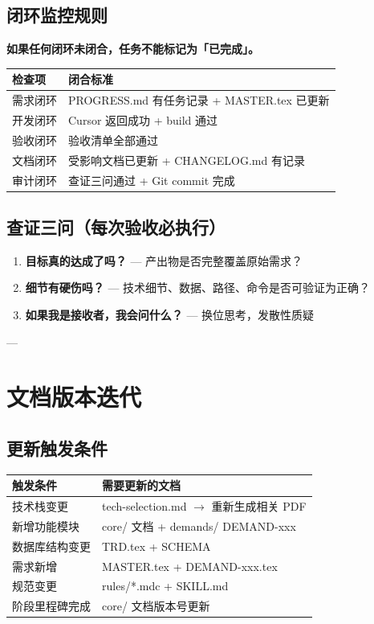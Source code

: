 \documentclass[11pt,a4paper]{article}
\begin{document}
\subsection{闭环监控规则}

\textbf{如果任何闭环未闭合，任务不能标记为「已完成」。}

\begin{table}[h]
\centering
\begin{tabularx}{\linewidth}{lX}
\toprule
\textbf{检查项} & \textbf{闭合标准} \\
\midrule
需求闭环 & PROGRESS.md 有任务记录 + MASTER.tex 已更新 \\
开发闭环 & Cursor 返回成功 + build 通过 \\
验收闭环 & 验收清单全部通过 \\
文档闭环 & 受影响文档已更新 + CHANGELOG.md 有记录 \\
审计闭环 & 查证三问通过 + Git commit 完成 \\
\bottomrule
\end{tabularx}
\end{table}

\subsection{查证三问（每次验收必执行）}

\begin{enumerate}[nosep]
  \item \textbf{目标真的达成了吗？} --- 产出物是否完整覆盖原始需求？
  \item \textbf{细节有硬伤吗？} --- 技术细节、数据、路径、命令是否可验证为正确？
  \item \textbf{如果我是接收者，我会问什么？} --- 换位思考，发散性质疑
\end{enumerate}

---

\section{文档版本迭代}

\subsection{更新触发条件}

\begin{table}[h]
\centering
\begin{tabularx}{\linewidth}{lX}
\toprule
\textbf{触发条件} & \textbf{需要更新的文档} \\
\midrule
技术栈变更 & tech-selection.md $\to$ 重新生成相关 PDF \\
新增功能模块 & core/ 文档 + demands/ DEMAND-xxx \\
数据库结构变更 & TRD.tex + SCHEMA \\
需求新增 & MASTER.tex + DEMAND-xxx.tex \\
规范变更 & rules/*.mdc + SKILL.md \\
阶段里程碑完成 & core/ 文档版本号更新 \\
\bottomrule
\end{tabularx}
\end{table}
\end{document}
